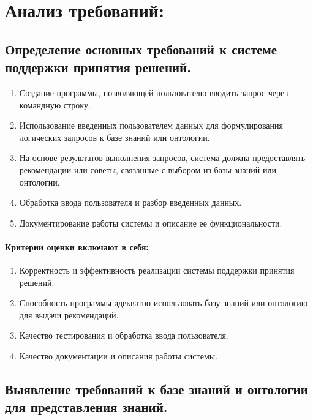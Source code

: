 \documentclass[12pt,onecolumn]{article}
\begin{document}
\section{Анализ требований:}
\subsection{Определение основных требований к системе поддержки принятия решений.}
\begin{enumerate}
  \item Создание программы, позволяющей пользователю вводить запрос через командную строку.
  \item Использование введенных пользователем данных для формулирования логических запросов к базе знаний или онтологии.
  \item На основе результатов выполнения запросов, система должна предоставлять рекомендации или советы, связанные с выбором из базы знаний или онтологии.
  \item Обработка ввода пользователя и разбор введенных данных.
  \item Документирование работы системы и описание ее функциональности.
\end{enumerate}
\paragraph{Критерии оценки включают в себя:}
\begin{enumerate}
  \item Корректность и эффективность реализации системы поддержки принятия решений.
  \item Способность программы адекватно использовать базу знаний или онтологию для выдачи рекомендаций.
  \item Качество тестирования и обработка ввода пользователя.
  \item Качество документации и описания работы системы.
\end{enumerate}
\subsection{Выявление требований к базе знаний и онтологии для представления знаний.}
\end{document}
